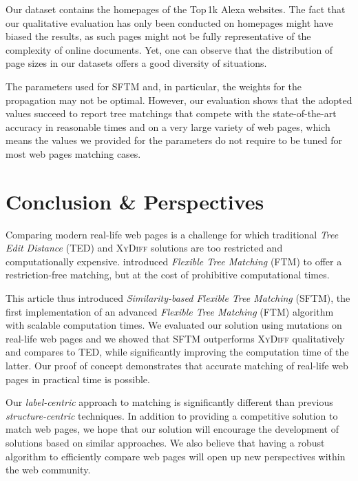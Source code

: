 Our dataset contains the homepages of the Top\,1k Alexa websites.
The fact that our qualitative evaluation has only been conducted on homepages might have biased the results, as such pages might not be fully representative of the complexity of online documents.
Yet, one can observe that the distribution of page sizes in our datasets offers a good diversity of situations.

The parameters used for SFTM and, in particular, the weights for the propagation may not be optimal.
However, our evaluation shows that the adopted values succeed to report tree matchings that compete with the state-of-the-art accuracy in reasonable times and on a very large variety of web pages, which means the values we provided for the parameters do not require to be tuned for most web pages matching cases.


\section{Conclusion \& Perspectives}\label{sec:conclusion}
Comparing modern real-life web pages is a challenge for which traditional \emph{Tree Edit Distance} (TED) and \textsc{XyDiff} solutions are too restricted and computationally expensive. 
\cite{Kumar2011_FTM} introduced \emph{Flexible Tree Matching} (FTM) to offer a restriction-free matching, but at the cost of prohibitive computational times.

This article thus introduced \emph{Similarity-based Flexible Tree Matching} (SFTM), the first implementation of an advanced \emph{Flexible Tree Matching} (FTM) algorithm with scalable computation times.
We evaluated our solution using mutations on real-life web pages and we showed that SFTM outperforms \textsc{XyDiff} qualitatively and compares to TED, while significantly improving the computation time of the latter.
Our proof of concept demonstrates that accurate matching of real-life web pages in practical time is possible.

Our \textit{label-centric} approach to matching is significantly different than previous \textit{structure-centric} techniques.
In addition to providing a competitive solution to match web pages, we hope that our solution will encourage the development of solutions based on similar approaches.
We also believe that having a robust algorithm to efficiently compare web pages will open up new perspectives within the web community.

